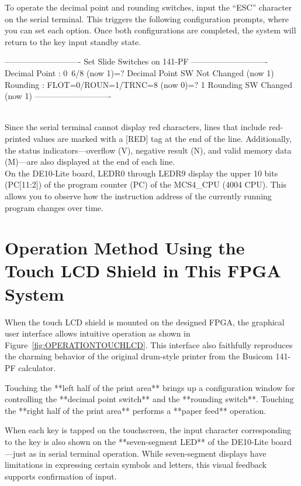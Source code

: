 To operate the decimal point and rounding switches, input the ``ESC'' character on the serial terminal. This triggers the following configuration prompts, where you can set each option. Once both configurations are completed, the system will return to the key input standby state.

\begin{scriptsize}
\begin{boxedverbatim}
----------------------------
Set Slide Switches on 141-PF
----------------------------
Decimal Point : 0~6/8 (now 1)=? 
Decimal Point SW Not Changed (now 1)
Rounding : FLOT=0/ROUN=1/TRNC=8 (now 0)=? 1
Rounding SW Changed (now 1)
----------------------------
\end{boxedverbatim}
\end{scriptsize}
\\

Since the serial terminal cannot display red characters, lines that include red-printed values are marked with a [RED] tag at the end of the line. Additionally, the status indicators—overflow (V), negative result (N), and valid memory data (M)—are also displayed at the end of each line.\\

On the DE10-Lite board, LEDR0 through LEDR9 display the upper 10 bits (PC[11:2]) of the program counter (PC) of the MCS4\_CPU (4004 CPU). This allows you to observe how the instruction address of the currently running program changes over time.

\section{Operation Method Using the Touch LCD Shield in This FPGA System}

When the touch LCD shield is mounted on the designed FPGA, the graphical user interface allows intuitive operation as shown in Figure~\ref{fig:OPERATIONTOUCHLCD}. This interface also faithfully reproduces the charming behavior of the original drum-style printer from the Busicom 141-PF calculator.

Touching the **left half of the print area** brings up a configuration window for controlling the **decimal point switch** and the **rounding switch**. Touching the **right half of the print area** performs a **paper feed** operation.

When each key is tapped on the touchscreen, the input character corresponding to the key is also shown on the **seven-segment LED** of the DE10-Lite board—just as in serial terminal operation. While seven-segment displays have limitations in expressing certain symbols and letters, this visual feedback supports confirmation of input.\\


